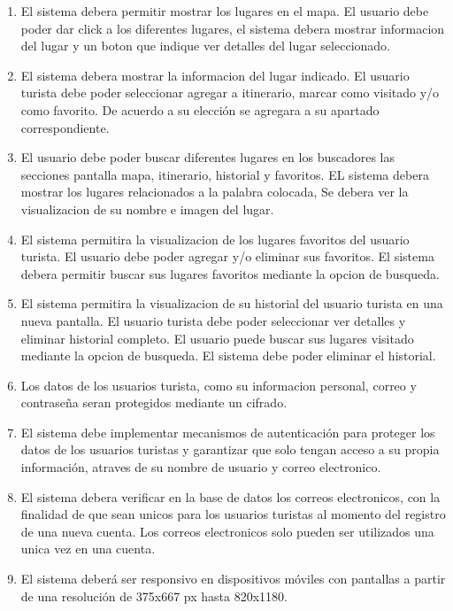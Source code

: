 \documentclass{article}
\begin{document}
\begin{enumerate}
\item El sistema debera permitir mostrar los lugares en el mapa. El usuario debe poder dar click a los diferentes lugares, el sistema debera mostrar informacion del lugar y un boton que indique ver detalles del lugar seleccionado.

\item El sistema debera mostrar la informacion del lugar indicado. El usuario turista debe poder seleccionar agregar a itinerario, marcar como visitado y/o como favorito. De acuerdo a su elección se agregara a su apartado correspondiente.

\item El usuario debe poder buscar diferentes lugares en los buscadores las secciones pantalla mapa, itinerario, historial y favoritos. EL sistema debera mostrar los lugares relacionados a la palabra colocada, Se debera ver la visualizacion de su nombre e imagen del lugar.

\item El sistema permitira la visualizacion de los lugares favoritos del usuario turista. El usuario debe poder agregar y/o eliminar sus favoritos. El sistema debera permitir buscar sus lugares favoritos mediante la opcion de busqueda.

\item El sistema permitira la visualizacion de su historial del usuario turista en una nueva pantalla. El usuario turista debe poder seleccionar ver detalles y eliminar historial completo. El usuario puede buscar sus lugares visitado mediante la opcion de busqueda. El sistema debe poder eliminar el historial.
    
    \item Los datos de los usuarios turista, como su informacion personal, correo y contraseña seran protegidos mediante un cifrado.
    
    \item El sistema debe implementar mecanismos de autenticación para proteger los datos de los usuarios turistas y garantizar que solo tengan acceso a su propia información, atraves de su nombre de usuario y correo electronico.

    \item El sistema debera verificar en la base de datos los correos electronicos, con la finalidad de que sean unicos para los usuarios turistas al momento del registro de una nueva cuenta. Los correos electronicos solo pueden ser utilizados una unica vez en una cuenta.

    \item El sistema deberá ser responsivo en dispositivos móviles con pantallas a partir de una resolución de 375x667 px hasta 820x1180.
    

\end{enumerate}
\end{document}
